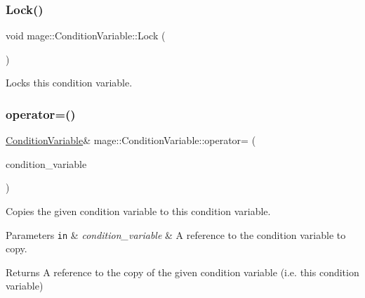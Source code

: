 \subsubsection{\texorpdfstring{Lock()}{Lock()}}
{\footnotesize\ttfamily void mage\+::\+Condition\+Variable\+::\+Lock (\begin{DoxyParamCaption}{ }\end{DoxyParamCaption})\hspace{0.3cm}{\ttfamily [noexcept]}}

Locks this condition variable. \hypertarget{classmage_1_1_condition_variable_ac83eae5353cd004ee06fe2376e5bdbf4}{}\label{classmage_1_1_condition_variable_ac83eae5353cd004ee06fe2376e5bdbf4} 
\subsubsection{\texorpdfstring{operator=()}{operator=()}\hspace{0.1cm}{\footnotesize\ttfamily [1/2]}}
{\footnotesize\ttfamily \hyperlink{classmage_1_1_condition_variable}{Condition\+Variable}\& mage\+::\+Condition\+Variable\+::operator= (\begin{DoxyParamCaption}\item[{const \hyperlink{classmage_1_1_condition_variable}{Condition\+Variable} \&}]{condition\+\_\+variable }\end{DoxyParamCaption})\hspace{0.3cm}{\ttfamily [delete]}}

Copies the given condition variable to this condition variable.


\begin{DoxyParams}[1]{Parameters}
\mbox{\tt in}  & {\em condition\+\_\+variable} & A reference to the condition variable to copy. \\
\hline
\end{DoxyParams}
\begin{DoxyReturn}{Returns}
A reference to the copy of the given condition variable (i.\+e. this condition variable) 
\end{DoxyReturn}
\hypertarget{classmage_1_1_condition_variable_a7603006142e843daeee03751fb59249a}{}\label{classmage_1_1_condition_variable_a7603006142e843daeee03751fb59249a} 
